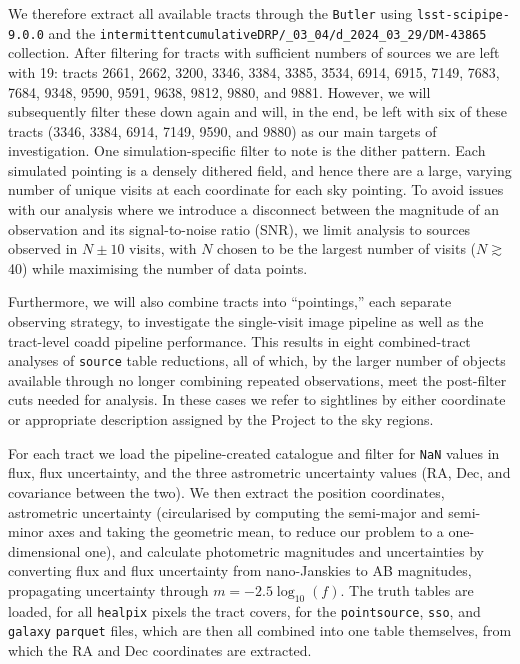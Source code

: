 \documentclass[SE,lsstdraft,authoryear,toc]{lsstdoc}
\begin{document}
We therefore extract all available tracts through the \texttt{Butler} using \texttt{lsst-scipipe-9.0.0} and the \texttt{intermittentcumulativeDRP/\_03\_04/\allowbreak d\_2024\_03\_29/DM-43865} collection.
After filtering for tracts with sufficient numbers of sources we are left with 19: tracts 2661, 2662, 3200, 3346, 3384, 3385, 3534, 6914, 6915, 7149, 7683, 7684, 9348, 9590, 9591, 9638, 9812, 9880, and 9881.
However, we will subsequently filter these down again and will, in the end, be left with six of these tracts (3346, 3384, 6914, 7149, 9590, and 9880) as our main targets of investigation.
One simulation-specific filter to note is the dither pattern.
Each simulated pointing is a densely dithered field, and hence there are a large, varying number of unique visits at each coordinate for each sky pointing.
To avoid issues with our analysis where we introduce a disconnect between the magnitude of an observation and its signal-to-noise ratio (SNR), we limit analysis to sources observed in $N\pm10$ visits, with $N$ chosen to be the largest number of visits ($N \gtrsim$ 40) while maximising the number of data points.

Furthermore, we will also combine tracts into ``pointings,'' each separate observing strategy, to investigate the single-visit image pipeline as well as the tract-level coadd pipeline performance.
This results in eight combined-tract analyses of \texttt{source} table reductions, all of which, by the larger number of objects available through no longer combining repeated observations, meet the post-filter cuts needed for analysis.
In these cases we refer to sightlines by either coordinate or appropriate description assigned by the Project to the sky regions.

For each tract we load the pipeline-created catalogue and filter for \texttt{NaN} values in flux, flux uncertainty, and the three astrometric uncertainty values (RA, Dec, and covariance between the two).
We then extract the position coordinates, astrometric uncertainty (circularised by computing the semi-major and semi-minor axes and taking the geometric mean, to reduce our problem to a one-dimensional one), and calculate photometric magnitudes and uncertainties by converting flux and flux uncertainty from nano-Janskies to AB magnitudes, propagating uncertainty through $m = - 2.5 \log_{10}(f)$.
The truth tables are loaded, for all \texttt{healpix} pixels the tract covers, for the \texttt{pointsource}, \texttt{sso}, and \texttt{galaxy} \texttt{parquet} files, which are then all combined into one table themselves, from which the RA and Dec coordinates are extracted.
\end{document}
